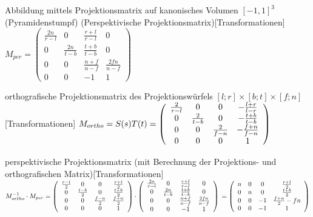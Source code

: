 \documentclass[a7paper,print]{kartei}
\begin{document}
\begin{karte}[CGIS]{Abbildung mittels Projektionsmatrix auf kanonisches Volumen $[-1,1]^3$ (Pyramidenstumpf) (Perspektivische Projektionsmatrix)}[Transformationen]
$M_{per} = \left( \begin{array}{cccc}
\frac{2n}{r-l} & 0 & \frac{r+l}{r-l} & 0 \\
0 & \frac{2n}{t-b} & \frac{t+b}{t-b} & 0 \\
0 & 0 & \frac{n+f}{n-f} & \frac{2fn}{n-f}\\
0 & 0 & -1 & 1
\end{array}
\right)$
\end{karte}

\begin{karte}[CGIS]{orthografische Projektionsmatrix des Projektionswürfels $[l;r] \times [b;t]\times [f;n]$}[Transformationen]
$M_{ortho} = S(s)T(t) \\\\
= \left( \begin{array}{cccc}
\frac{2}{r-l} & 0 & 0 & -\frac{l+r}{l-r} \\
0 & \frac{2}{t-b} & 0 & -\frac{t+b}{t-b} \\
0 & 0 & \frac{2}{f-n} & -\frac{f+n}{f-n}\\
0 & 0 & 0 & 1
\end{array}
\right)$
\end{karte}

\begin{karte}[CGIS]{perspektivische Projektionsmatrix (mit Berechnung der Projektions- und orthografischen Matrix)}[Transformationen]
$M_{ortho}^{-1} \cdot M_{per} \\\\
= \left( \begin{array}{cccc}
\frac{r-l}{2} & 0 & 0 & \frac{r+l}{2} \\
0 & \frac{t-b}{2} & 0 & \frac{t+b}{2} \\
0 & 0 & \frac{f-n}{2} & \frac{f+n}{2}\\
0 & 0 & 0 & 1
\end{array}
\right) \cdot 
\left( \begin{array}{cccc}
\frac{2n}{r-l} & 0 & \frac{r+l}{r-l} & 0 \\
0 & \frac{2n}{t-b} & \frac{t+b}{t-b} & 0 \\
0 & 0 & \frac{n+f}{n-f} & \frac{2fn}{n-f}\\
0 & 0 & -1 & 1
\end{array}
\right)\\
= \left( \begin{array}{cccc}
n & 0 & 0 & \frac{r+l}{2} \\
0 & n & 0 & \frac{t+b}{2} \\
0 & 0 & -1 & \frac{f+n}{2}-fn\\
0 & 0 & -1 & 1
\end{array}
\right)$
\end{karte}
\end{document}
